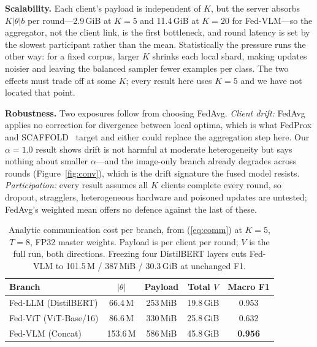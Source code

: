 \documentclass[letterpaper, conference]{IEEEtran}
\begin{document}
\textbf{Scalability.} Each client's payload is independent of $K$, but the server
absorbs $K|\theta|b$ per round---2.9\,GiB at $K{=}5$ and 11.4\,GiB at $K{=}20$ for
Fed-VLM---so the aggregator, not the client link, is the first bottleneck, and round
latency is set by the slowest participant rather than the mean. Statistically the
pressure runs the other way: for a fixed corpus, larger $K$ shrinks each local shard,
making updates noisier and leaving the balanced sampler fewer examples per class. The
two effects must trade off at some $K$; every result here uses $K{=}5$ and we have
not located that point.

\textbf{Robustness.} Two exposures follow from choosing FedAvg. \emph{Client drift:}
FedAvg applies no correction for divergence between local optima, which is what
FedProx and SCAFFOLD~\cite{Karimireddy2020} target and either could replace the
aggregation step here. Our $\alpha{=}1.0$ result shows drift is not harmful at
moderate heterogeneity but says nothing about smaller $\alpha$---and the image-only
branch already degrades across rounds (Figure~\ref{fig:conv}), which is the drift
signature the fused model resists. \emph{Participation:} every result assumes all $K$
clients complete every round, so dropout, stragglers, heterogeneous hardware and
poisoned updates are untested; FedAvg's weighted mean offers no defence against the
last of these.

\begin{table}[t]
\caption{Analytic communication cost per branch, from (\ref{eq:comm}) at $K{=}5$, $T{=}8$, FP32 master weights. Payload is per client per round; $V$ is the full run, both directions. Freezing four DistilBERT layers cuts Fed-VLM to 101.5\,M / 387\,MiB / 30.3\,GiB at unchanged F1.}
\label{tab:comm}
\centering\footnotesize
\setlength\tabcolsep{4pt}
\begin{tabular}{lcccc}
\toprule
\textbf{Branch} & $|\theta|$ & \textbf{Payload} & \textbf{Total $V$} & \textbf{Macro F1}\\
\midrule
Fed-LLM (DistilBERT)  & 66.4\,M  & 253\,MiB & 19.8\,GiB & 0.953 \\
Fed-ViT (ViT-Base/16) & 86.6\,M  & 330\,MiB & 25.8\,GiB & 0.632 \\
Fed-VLM (Concat)      & 153.6\,M & 586\,MiB & 45.8\,GiB & \textbf{0.956} \\
\bottomrule
\end{tabular}
\end{table}
\end{document}
